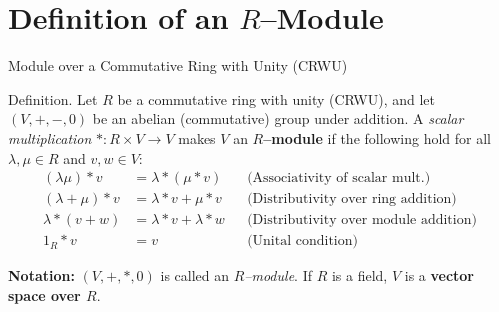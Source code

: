 
\date{17 October 2025}



\begin{frame}
  \cmctitleframe
\end{frame}

\section{Definition of an $R$–Module}

\begin{frame}{Module over a Commutative Ring with Unity (CRWU)}
\begin{block}{Definition.}
Let $R$ be a commutative ring with unity (CRWU), and let $(V, +, -, 0)$ be an abelian (commutative) group under addition.
A \emph{scalar multiplication} $*: R\times V \to V$ makes $V$ an \textbf{$R$–module} if the following hold for all $\lambda,\mu\in R$ and $v,w\in V$:
\[
\begin{aligned}
(\lambda\mu)*v &= \lambda*(\mu*v) && \text{(Associativity of scalar mult.)}\\
(\lambda+\mu)*v &= \lambda*v+\mu*v && \text{(Distributivity over ring addition)}\\
\lambda*(v+w) &= \lambda*v+\lambda*w && \text{(Distributivity over module addition)}\\
1_R*v &= v && \text{(Unital condition)}
\end{aligned}
\]

\textbf{Notation:} $(V,+,*,0)$ is called an \emph{$R$–module}.
If $R$ is a field, $V$ is a \textbf{vector space over $R$}.

\end{block}

\end{frame}


